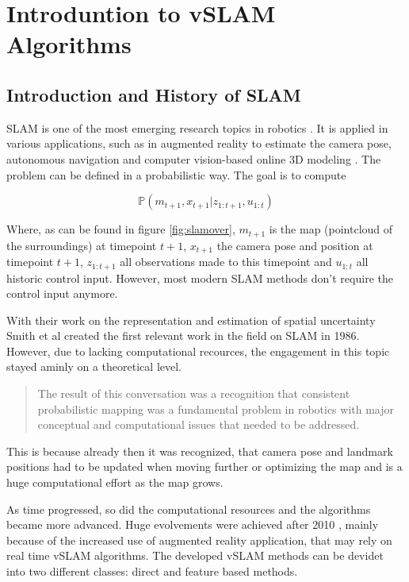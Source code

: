 \chapter{Introduntion to vSLAM Algorithms}

\section{Introduction and History of SLAM}

SLAM is one of the most emerging research topics in robotics \cite{slamintro}. It is applied in various applications, such as in augmented reality to estimate the camera pose,
autonomous navigation and computer vision-based online 3D modeling \cite{evolved} \cite{dso}.
The problem can be defined in a probabilistic way. The goal is to compute 

$$\mathbb{P}\left(m_{t+1},x_{t+1}|z_{1:t+1},u_{1:t}\right)$$

Where, as can be found in figure \ref{fig:slamover}, $m_{t+1}$ is the map (pointcloud of the surroundings) at timepoint $t+1$, $x_{t+1}$ the 
camera pose and position at timepoint $t+1$, $z_{1:t+1}$ all observations made to this timepoint and $u_{1:t}$ all historic control input. However, most
modern SLAM methods don't require the control input anymore. 


With their work on the representation and estimation of spatial uncertainty \cite{hist1}
Smith et al created the first relevant work in the field on SLAM in 1986. However, due to lacking computational recources, the engagement in this topic stayed aminly
on a theoretical level. 


  \begin{quote}
   The result of this conversation was a recognition that
	consistent probabilistic mapping was a fundamental problem
	in robotics with major conceptual and computational issues
	that needed to be addressed. \cite{hist2}
  \end{quote}
  
This is because already then it was recognized, that camera pose and landmark positions had to be updated when moving further or optimizing the map and is a huge computational 
effort as the map grows. 

As time progressed, so did the computational resources and the algorithms became more advanced. Huge evolvements were achieved after 2010 \cite{evolved}, mainly because of the increased
use of augmented reality application, that may rely on real time vSLAM algorithms. The developed vSLAM methods can be devidet into two different classes: direct and feature based methods.

